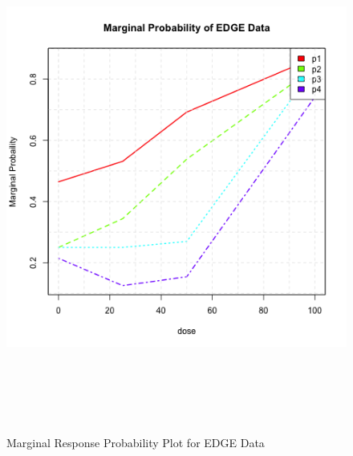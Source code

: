 \documentclass[12pt,oneside]{report}
\theoremstyle{definition}
\theoremstyle{mystyle}
\begin{document}
\newpage
\begin{figure}[h]
	\begin{center}
		\includegraphics*[height=15cm,width=15cm]{edge1.png}\
	\end{center}
	\vspace{-0.3in}
	\caption{Marginal Response Probability Plot for EDGE Data }
	\label{Fig:p1}
\end{figure}	
\end{document}
